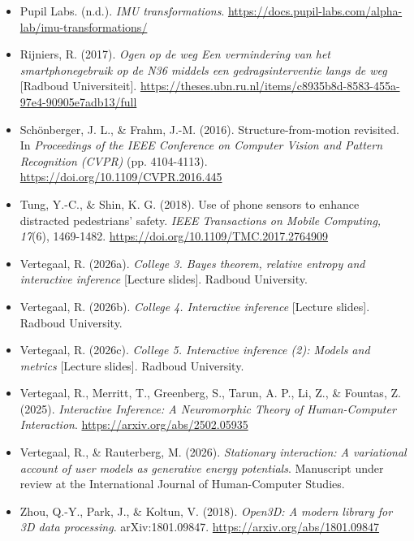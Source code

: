 \documentclass[a4paper]{article}
\begin{document}
\begin{itemize}
	\item Pupil Labs. (n.d.). \textit{IMU transformations}. \href{https://docs.pupil-labs.com/alpha-lab/imu-transformations/}{https://docs.pupil-labs.com/alpha-lab/imu-transformations/}
	\item Rijniers, R. (2017). \textit{Ogen op de weg Een vermindering van het smartphonegebruik op de N36 middels een gedragsinterventie langs de weg} [Radboud Universiteit]. \href{https://theses.ubn.ru.nl/items/c8935b8d-8583-455a-97e4-90905e7adb13/full}{https://theses.ubn.ru.nl/items/c8935b8d-8583-455a-97e4-90905e7adb13/full}
	\item Schönberger, J. L., \& Frahm, J.-M. (2016). Structure-from-motion revisited. In \textit{Proceedings of the IEEE Conference on Computer Vision and Pattern Recognition (CVPR)} (pp. 4104-4113). \href{https://doi.org/10.1109/CVPR.2016.445}{https://doi.org/10.1109/CVPR.2016.445}
	\item Tung, Y.-C., \& Shin, K. G. (2018). Use of phone sensors to enhance distracted pedestrians' safety. \textit{IEEE Transactions on Mobile Computing, 17}(6), 1469-1482. \href{https://doi.org/10.1109/TMC.2017.2764909}{https://doi.org/10.1109/TMC.2017.2764909}
	\item Vertegaal, R. (2026a). \textit{College 3. Bayes theorem, relative entropy and interactive inference} [Lecture slides]. Radboud University.
	\item Vertegaal, R. (2026b). \textit{College 4. Interactive inference} [Lecture slides]. Radboud University.
	\item Vertegaal, R. (2026c). \textit{College 5. Interactive inference (2): Models and metrics} [Lecture slides]. Radboud University.
	\item Vertegaal, R., Merritt, T., Greenberg, S., Tarun, A. P., Li, Z., \& Fountas, Z. (2025). \textit{Interactive Inference: A Neuromorphic Theory of Human-Computer Interaction}. \href{https://arxiv.org/abs/2502.05935}{https://arxiv.org/abs/2502.05935}
	\item Vertegaal, R., \& Rauterberg, M. (2026). \textit{Stationary interaction: A variational account of user models as generative energy potentials}. Manuscript under review at the International Journal of Human-Computer Studies.
	\item Zhou, Q.-Y., Park, J., \& Koltun, V. (2018). \textit{Open3D: A modern library for 3D data processing}. arXiv:1801.09847. \href{https://arxiv.org/abs/1801.09847}{https://arxiv.org/abs/1801.09847}
\end{itemize}
\end{document}
